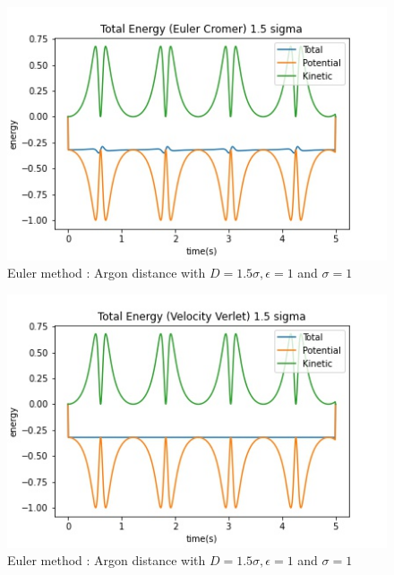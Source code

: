 \begin{figure}[h!]
        \centering 
        \includegraphics[scale=0.8]{./py/2civ_allEnergiesEulerCromer15.jpg} 
        \caption{Euler method : Argon distance with $D = 1.5 \sigma, \epsilon = 1$ and $\sigma = 1$ }
        \label{fig:allEnergiesEulerCromer15}
\end{figure}
\begin{figure}[h!]
        \centering 
        \includegraphics[scale=0.8]{./py/2civ_allEnergiesVelocityVerlet15.jpg} 
        \caption{Euler method : Argon distance with $D = 1.5 \sigma, \epsilon = 1$ and $\sigma = 1$ }
        \label{fig:allEnergiesVelver15}
\end{figure}

